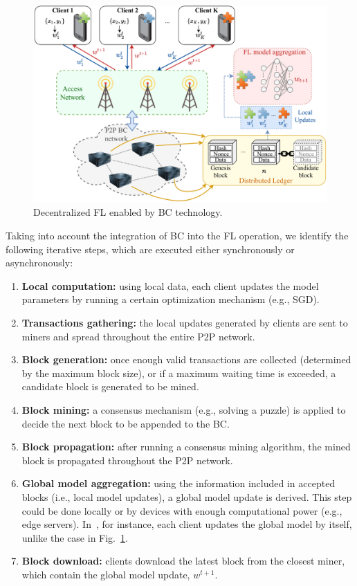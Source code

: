 \documentclass[10pt,journal,compsoc]{IEEEtran}
\begin{document}
\begin{figure}[ht!]
	\centering
	\includegraphics[width=\linewidth]{img/blockchain_federated_learning2.pdf}
	\caption{Decentralized FL enabled by BC technology.}
	\label{fig:blockchain_federated_learning}
\end{figure}

Taking into account the integration of BC into the FL operation, we identify the following iterative steps, which are executed either synchronously or asynchronously:
\begin{enumerate}
	\item \textbf{Local computation:} using local data, each client updates the model parameters by running a certain optimization mechanism (e.g., SGD).
	\item \textbf{Transactions gathering:} the local updates generated by clients are sent to miners and spread throughout the entire P2P network.
	\item \textbf{Block generation:} once enough valid transactions are collected (determined by the maximum block size), or if a maximum waiting time is exceeded, a candidate block is generated to be mined.
	\item \textbf{Block mining:} a consensus mechanism (e.g., solving a puzzle) is applied to decide the next block to be appended to the BC.
	\item \textbf{Block propagation:} after running a consensus mining algorithm, the mined block is propagated throughout the P2P network.
	\item \textbf{Global model aggregation:} using the information included in accepted blocks (i.e., local model updates), a global model update is derived. This step could be done locally or by devices with enough computational power (e.g., edge servers). In~\cite{kim2019blockchained,ma2020federated}, for instance, each client updates the global model by itself, unlike the case in Fig.~\ref{fig:blockchain_federated_learning}.
	\item \textbf{Block download:} clients download the latest block from the closest miner, which contain the global model update, $w^{t+1}$.
\end{enumerate}
\end{document}
